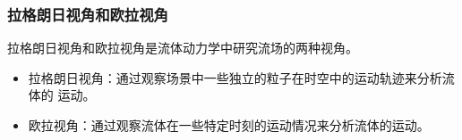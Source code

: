 \documentclass[xcolor=svgnames,serif,table]{beamer}
\begin{document}
\begin{frame}
  \frametitle{拉格朗日视角和欧拉视角}
  拉格朗日视角和欧拉视角是流体动力学中研究流场的两种视角。

  \begin{itemize}
  \item 拉格朗日视角：通过观察场景中一些独立的粒子在时空中的运动轨迹来分析流体的
    运动。
  \item 欧拉视角：通过观察流体在一些特定时刻的运动情况来分析流体的运动。
  \end{itemize}

  \begin{figure}
    \centering
    ~~
    
    \medskip
    
  \end{figure}
\end{frame}
\end{document}

